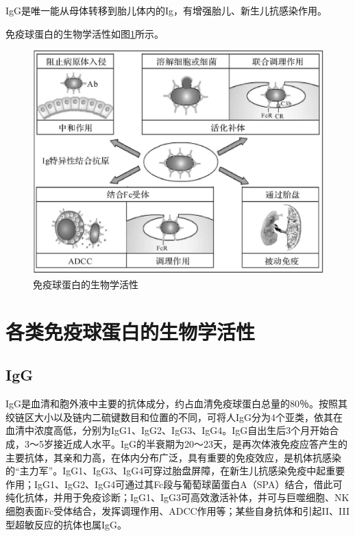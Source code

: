 IgG是唯一能从母体转移到胎儿体内的Ig，有增强胎儿、新生儿抗感染作用。

免疫球蛋白的生物学活性如图\ref{fig4-10}所示。

\begin{figure}[!htbp]
 \centering
 \includegraphics{./images/Image00070.jpg}
 \captionsetup{justification=centering}
 \caption{免疫球蛋白的生物学活性}
 \label{fig4-10}
  \end{figure} 

\section{各类免疫球蛋白的生物学活性}


\subsection{IgG}

IgG是血清和胞外液中主要的抗体成分，约占血清免疫球蛋白总量的80％。按照其绞链区大小以及链内二硫键数目和位置的不同，可将人IgG分为4个亚类，依其在血清中浓度高低，分别为IgG1、IgG2、IgG3、IgG4。IgG自出生后3个月开始合成，3～5岁接近成人水平。IgG的半衰期为20～23天，是再次体液免疫应答产生的主要抗体，其亲和力高，在体内分布广泛，具有重要的免疫效应，是机体抗感染的“主力军”。IgG1、IgG3、IgG4可穿过胎盘屏障，在新生儿抗感染免疫中起重要作用；IgG1、IgG2、IgG4可通过其Fc段与葡萄球菌蛋白A（SPA）结合，借此可纯化抗体，并用于免疫诊断；IgG1、IgG3可高效激活补体，并可与巨噬细胞、NK细胞表面Fc受体结合，发挥调理作用、ADCC作用等；某些自身抗体和引起II、III型超敏反应的抗体也属IgG。


